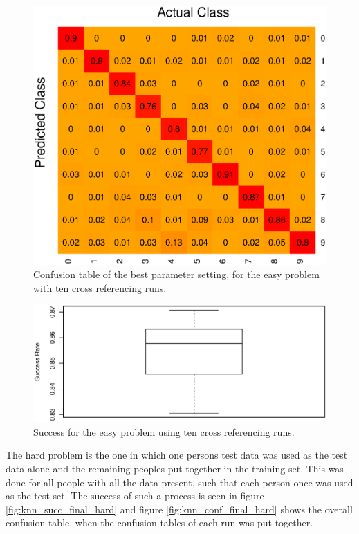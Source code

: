 \begin{figure}[H]
\centering
\includegraphics[width = 0.65 \textwidth]{graphics/knn_confusion_bestparam_easy}
\caption{Confusion table of the best parameter setting, for the easy problem with ten cross referencing runs.}
\label{fig:knn_conf_final_easy}
\end{figure}


\begin{figure}[H]
\centering
\includegraphics[width = 0.9 \textwidth]{graphics/knn_final_full_easy}
\caption{Success for the easy problem using ten cross referencing runs.}
\label{fig:knn_succ_final_easy}
\end{figure}


The hard problem is the one in which one persons test data was used as the test data alone and the remaining peoples put together in the training set.
This was done for all people with all the data present, such that each person once was used as the test set.
The success of such a process is seen in figure \ref{fig:knn_succ_final_hard} and figure \ref{fig:knn_conf_final_hard} shows the overall confusion table, when the confusion tables of each run was put together.


